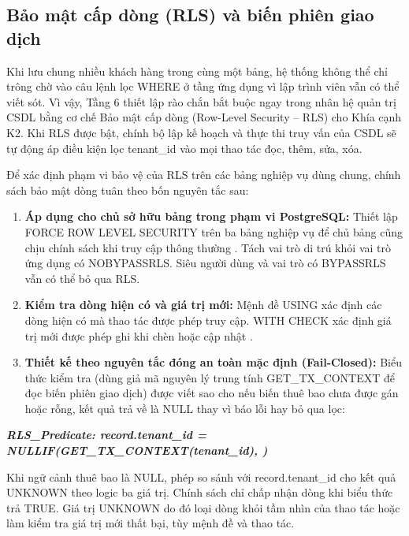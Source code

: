 
\subsection{Bảo mật cấp dòng (RLS) và biến phiên giao dịch}\label{v4-sec-3-4-1}

Khi lưu chung nhiều khách hàng trong cùng một bảng, hệ thống không thể chỉ trông chờ vào câu lệnh lọc WHERE ở tầng ứng dụng vì lập trình viên vẫn có thể viết sót. Vì vậy, Tầng 6 thiết lập rào chắn bắt buộc ngay trong nhân hệ quản trị CSDL bằng cơ chế Bảo mật cấp dòng (Row-Level Security -- RLS) cho Khía cạnh K2. Khi RLS được bật, chính bộ lập kế hoạch và thực thi truy vấn của CSDL sẽ tự động áp điều kiện lọc tenant\_\allowbreak{}id vào mọi thao tác đọc, thêm, sửa, xóa.

Để xác định phạm vi bảo vệ của RLS trên các bảng nghiệp vụ dùng chung, chính sách bảo mật dòng tuân theo bốn nguyên tắc sau:

\begin{enumerate}
\def\labelenumi{\arabic{enumi}.}
\item
  \textbf{Áp dụng cho chủ sở hữu bảng trong phạm vi PostgreSQL:} Thiết lập FORCE ROW LEVEL SECURITY trên ba bảng nghiệp vụ để chủ bảng cũng chịu chính sách khi truy cập thông thường \cite{v4-22}. Tách vai trò di trú khỏi vai trò ứng dụng có NOBYPASSRLS. Siêu người dùng và vai trò có BYPASSRLS vẫn có thể bỏ qua RLS.
\item
  \textbf{Kiểm tra dòng hiện có và giá trị mới:} Mệnh đề USING xác định các dòng hiện có mà thao tác được phép truy cập. WITH CHECK xác định giá trị mới được phép ghi khi chèn hoặc cập nhật \cite{v4-22}.
\item
  \textbf{Thiết kế theo nguyên tắc đóng an toàn mặc định (Fail-Closed):} Biểu thức kiểm tra (dùng giả mã nguyên lý trung tính GET\_\allowbreak{}TX\_\allowbreak{}CONTEXT để đọc biến phiên giao dịch) được viết sao cho nếu biến thuê bao chưa được gán hoặc rỗng, kết quả trả về là NULL thay vì báo lỗi hay bỏ qua lọc:
\end{enumerate}

\textbf{\emph{RLS\_\allowbreak{}Predicate: record.tenant\_\allowbreak{}id = NULLIF(GET\_\allowbreak{}TX\_\allowbreak{}CONTEXT(\textquotesingle tenant\_\allowbreak{}id\textquotesingle), \textquotesingle\textquotesingle)}}

Khi ngữ cảnh thuê bao là NULL, phép so sánh với record.tenant\_\allowbreak{}id cho kết quả UNKNOWN theo logic ba giá trị. Chính sách chỉ chấp nhận dòng khi biểu thức trả TRUE. Giá trị UNKNOWN do đó loại dòng khỏi tầm nhìn của thao tác hoặc làm kiểm tra giá trị mới thất bại, tùy mệnh đề và thao tác.

